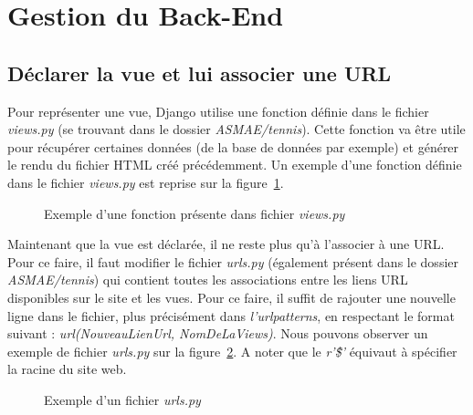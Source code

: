 \section{Gestion du Back-End}

\subsection{Déclarer la vue et lui associer une URL}

Pour représenter une vue, Django utilise une fonction définie dans le fichier \textit{views.py} (se trouvant dans le dossier \textit{ASMAE/tennis}). Cette fonction va être utile pour récupérer certaines données (de la base de données par exemple) et générer le rendu du fichier HTML créé précédemment. Un exemple d'une fonction définie dans le fichier \textit{views.py} est reprise sur la figure~\ref{fig:Exemple d'une fonction présente dans le fichier views.py}. 

\begin{figure}[!ht]
\centering
\begin{framed}

\end{framed}
\caption{Exemple d'une fonction présente dans fichier \textit{views.py}}
\label{fig:Exemple d'une fonction présente dans le fichier views.py}
\end{figure}
\FloatBarrier

Maintenant que la vue est déclarée, il ne reste plus qu'à l'associer à une URL. Pour ce faire, il faut modifier le fichier \textit{urls.py} (également présent dans le dossier \textit{ASMAE/tennis}) qui contient toutes les associations entre les liens URL disponibles sur le site et les vues. Pour ce faire, il suffit de rajouter une nouvelle ligne dans le fichier, plus précisément dans \textit{l'urlpatterns}, en respectant le format suivant : \textit{url(NouveauLienUrl, NomDeLaViews)}. Nous pouvons observer un exemple de fichier \textit{urls.py} sur la figure~\ref{fig:Exemple d'un fichier urls.py}. A noter que le \textit{r'\^\$'} équivaut à spécifier la racine du site web.

\begin{figure}[!ht]
\centering
\begin{framed}

\end{framed}
\caption{Exemple d'un fichier \textit{urls.py}}
\label{fig:Exemple d'un fichier urls.py}
\end{figure}
\FloatBarrier

